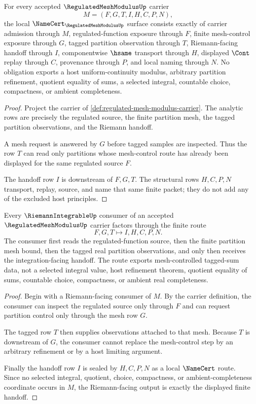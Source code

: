 \begin{theorem}
\label{thm:regulated-mesh-modulus-obligations}
For every accepted $\RegulatedMeshModulusUp$ carrier
$$
M=(F,G,T,I,H,C,P,N),
$$
the local $\NameCert_{\RegulatedMeshModulusUp}$ surface consists exactly of carrier admission through $M$, regulated-function exposure through $F$, finite mesh-control exposure through $G$, tagged partition observation through $T$, Riemann-facing handoff through $I$, componentwise $\hsame$ transport through $H$, displayed $\Cont$ replay through $C$, provenance through $P$, and local naming through $N$. No obligation exports a host uniform-continuity modulus, arbitrary partition refinement, quotient equality of sums, a selected integral, countable choice, compactness, or ambient completeness.
\end{theorem}
\begin{proof}
Project the carrier of \autoref{def:regulated-mesh-modulus-carrier}. The analytic rows are precisely the regulated source, the finite partition mesh, the tagged partition observations, and the Riemann handoff.

A mesh request is answered by $G$ before tagged samples are inspected. Thus the row $T$ can read only partitions whose mesh-control route has already been displayed for the same regulated source $F$.

The handoff row $I$ is downstream of $F,G,T$. The structural rows $H,C,P,N$ transport, replay, source, and name that same finite packet; they do not add any of the excluded host principles.
\end{proof}

\begin{theorem}
\label{thm:regulated-mesh-modulus-riemann-handoff}
Every $\RiemannIntegrableUp$ consumer of an accepted $\RegulatedMeshModulusUp$ carrier factors through the finite route
$$
F,G,T \longmapsto I,H,C,P,N .
$$
The consumer first reads the regulated-function source, then the finite partition mesh bound, then the tagged real partition observations, and only then receives the integration-facing handoff. The route exports mesh-controlled tagged-sum data, not a selected integral value, host refinement theorem, quotient equality of sums, countable choice, compactness, or ambient real completeness.
\end{theorem}
\begin{proof}
Begin with a Riemann-facing consumer of $M$. By the carrier definition, the consumer can inspect the regulated source only through $F$ and can request partition control only through the mesh row $G$.

The tagged row $T$ then supplies observations attached to that mesh. Because $T$ is downstream of $G$, the consumer cannot replace the mesh-control step by an arbitrary refinement or by a host limiting argument.

Finally the handoff row $I$ is sealed by $H,C,P,N$ as a local $\NameCert$ route. Since no selected integral, quotient, choice, compactness, or ambient-completeness coordinate occurs in $M$, the Riemann-facing output is exactly the displayed finite handoff.
\end{proof}

